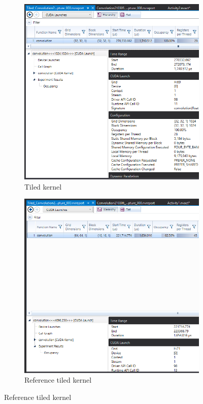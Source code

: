 \documentclass{article}
\begin{document}
\begin{figure}
    \centering
    \begin{subfigure}{0.45\textwidth}
        \includegraphics[width=\textwidth]{Optimized.PNG}
        \caption{Tiled kernel}
    \end{subfigure}
    \begin{subfigure}{0.45\textwidth}
        \includegraphics[width=\textwidth]{Optimized_Ref.PNG}
        \caption{Reference tiled kernel}
    \end{subfigure}
\end{figure}
\end{document}
